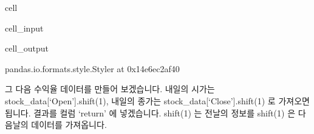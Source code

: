 \documentclass[letterpaper,10pt,english]{jupyterBook}
\begin{document}
\begin{sphinxuseclass}{cell}\begin{sphinxVerbatimInput}

\begin{sphinxuseclass}{cell_input}
\begin{sphinxVerbatim}[commandchars=\\\{\}]
\PYG{p}{[}\PYG{p}{]}  \PYG{p}{[}\PYG{p}{]}
\end{sphinxVerbatim}

\end{sphinxuseclass}\end{sphinxVerbatimInput}
\begin{sphinxVerbatimOutput}

\begin{sphinxuseclass}{cell_output}
\begin{sphinxVerbatim}[commandchars=\\\{\}]
\PYGZlt{}pandas.io.formats.style.Styler at 0x14e6ec2af40\PYGZgt{}
\end{sphinxVerbatim}

\end{sphinxuseclass}\end{sphinxVerbatimOutput}

\end{sphinxuseclass}


\sphinxAtStartPar
그 다음 수익율 데이터를 만들어 보겠습니다. 내일의 시가는 stock\_data{[}‘Open’{]}.shift(\sphinxhyphen{}1), 내일의 종가는 stock\_data{[}‘Close’{]}.shift(\sphinxhyphen{}1) 로 가져오면 됩니다. 결과를 컬럼 ‘return’ 에 넣겠습니다. shift(1) 는 전날의 정보를 shift(\sphinxhyphen{}1) 은 다음날의 데이터를 가져옵니다.
\end{document}
